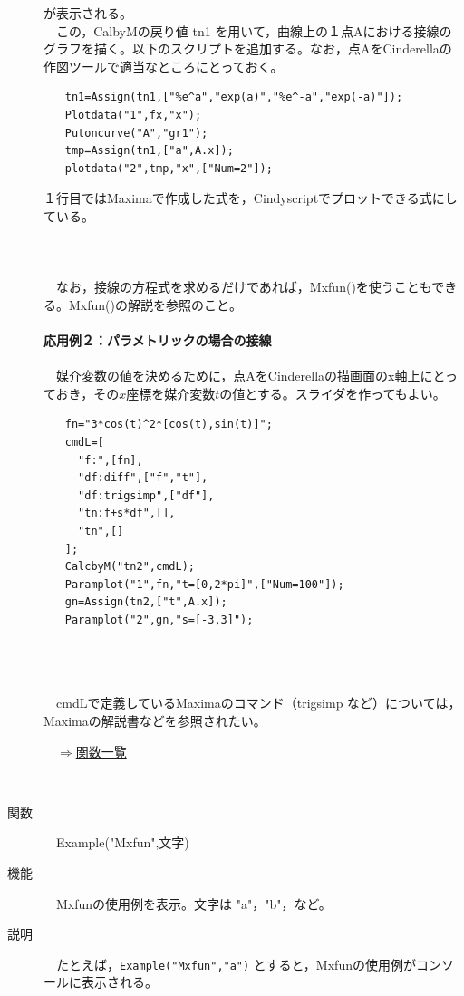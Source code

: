 \documentclass[papersize,a4paper,12pt,uplatex]{jsarticle}
\begin{document}
\begin{description}
\begin{verbatim}
\end{verbatim}
が表示される。\\
　この，CalbyMの戻り値 tn1 を用いて，曲線上の１点Aにおける接線のグラフを描く。以下のスクリプトを追加する。なお，点AをCinderellaの作図ツールで適当なところにとっておく。
\begin{verbatim}
　　tn1=Assign(tn1,["%e^a","exp(a)","%e^-a","exp(-a)"]);
　　Plotdata("1",fx,"x");
　　Putoncurve("A","gr1");
　　tmp=Assign(tn1,["a",A.x]);
　　plotdata("2",tmp,"x",["Num=2"]);
\end{verbatim}
１行目ではMaximaで作成した式を，Cindyscriptでプロットできる式にしている。\\
　\\
　　　　　　\\
　\\
　なお，接線の方程式を求めるだけであれば，Mxfun()を使うこともできる。Mxfun()の解説を参照のこと。\\
　\\
{\bf 応用例２：パラメトリックの場合の接線}\\
　\\
　媒介変数の値を決めるために，点AをCinderellaの描画面のx軸上にとっておき，その$x$座標を媒介変数$t$の値とする。スライダを作ってもよい。
\begin{verbatim}
　　fn="3*cos(t)^2*[cos(t),sin(t)]";
　　cmdL=[
　　  "f:",[fn],
　　  "df:diff",["f","t"],
　　  "df:trigsimp",["df"],
　　  "tn:f+s*df",[],
　　  "tn",[]
　　];
　　CalcbyM("tn2",cmdL);
　　Paramplot("1",fn,"t=[0,2*pi]",["Num=100"]);
　　gn=Assign(tn2,["t",A.x]);
　　Paramplot("2",gn,"s=[-3,3]");
\end{verbatim}
　\\
　　　　　　\\
　\\
　cmdLで定義しているMaximaのコマンド（trigsimp など）については，Maximaの解説書などを参照されたい。\\
\begin{flushright}　\hyperlink{functionlist}{$\Rightarrow$関数一覧}\end{flushright}
　\\
\hypertarget{example}{}
\item[関数]　Example("Mxfun",文字)
\item[機能]　Mxfunの使用例を表示。文字は "a"，"b"，など。
\item[説明]　たとえば，\verb|Example("Mxfun","a")| とすると，Mxfunの使用例がコンソールに表示される。\\
　\\


\end{description}
\end{document}
